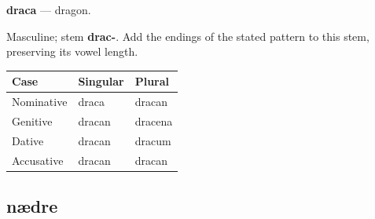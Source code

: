 \par\begin{minipage}{\linewidth}\raggedright
\textbf{draca} — dragon.

Masculine; stem \textbf{drac-}. Add the endings of the stated pattern to this stem, preserving its vowel length.

\par\begingroup
\fontsize{10.5}{13.2}\selectfont
\setlength{\LTleft}{0pt}\setlength{\LTright}{\fill}
\noindent
\begin{tabular}{@{}>{\raggedright\arraybackslash}p{39.46mm}>{\raggedright\arraybackslash}p{39.46mm}>{\raggedright\arraybackslash}p{39.46mm}@{}}
\toprule
\textbf{Case} & \textbf{Singular} & \textbf{Plural} \\
\midrule
Nominative & draca & dracan \\
Genitive & dracan & dracena \\
Dative & dracan & dracum \\
Accusative & dracan & dracan \\
\bottomrule
\end{tabular}
\par\endgroup

\end{minipage}\par
{}
\subsection*{nædre}

